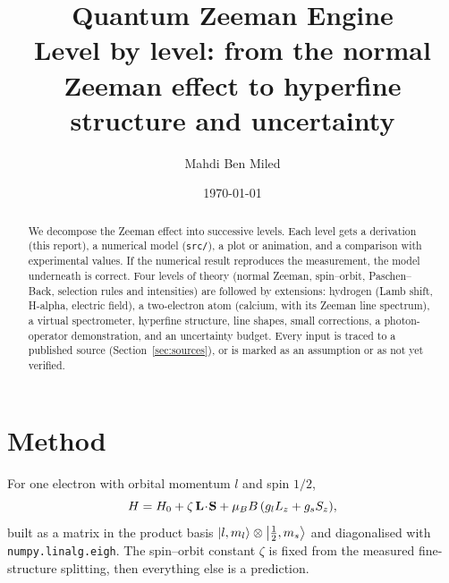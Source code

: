 \documentclass[11pt,a4paper]{article}
\title{Quantum Zeeman Engine\\ \large Level by level: from the normal Zeeman effect to hyperfine structure and uncertainty}
\author{Mahdi Ben Miled}
\date{\today}
\begin{document}
\maketitle
\tableofcontents

\begin{abstract}
We decompose the Zeeman effect into successive levels. Each level gets a derivation (this
report), a numerical model (\texttt{src/}), a plot or animation, and a comparison with
experimental values. If the numerical result reproduces the measurement, the model underneath is
correct. Four levels of theory (normal Zeeman, spin--orbit, Paschen--Back, selection rules and
intensities) are followed by extensions: hydrogen (Lamb shift, H-alpha, electric field), a
two-electron atom (calcium, with its Zeeman line spectrum), a virtual spectrometer, hyperfine structure, line shapes, small
corrections, a photon-operator demonstration, and an uncertainty budget. Every input is traced to a
published source (Section~\ref{sec:sources}), or is marked as an assumption or as not yet verified.
\end{abstract}



\section{Method}
For one electron with orbital momentum $l$ and spin $1/2$,
\begin{equation}
  H = H_0 + \zeta\, \vb{L}\!\cdot\!\vb{S} + \mu_B B\,(g_l L_z + g_s S_z),
\end{equation}
built as a matrix in the product basis $\ket{l,m_l}\otimes\ket{\tfrac12,m_s}$ and diagonalised
with \texttt{numpy.linalg.eigh}. The spin--orbit constant $\zeta$ is fixed from the measured
fine-structure splitting, then everything else is a prediction.






















\clearpage
\end{document}
